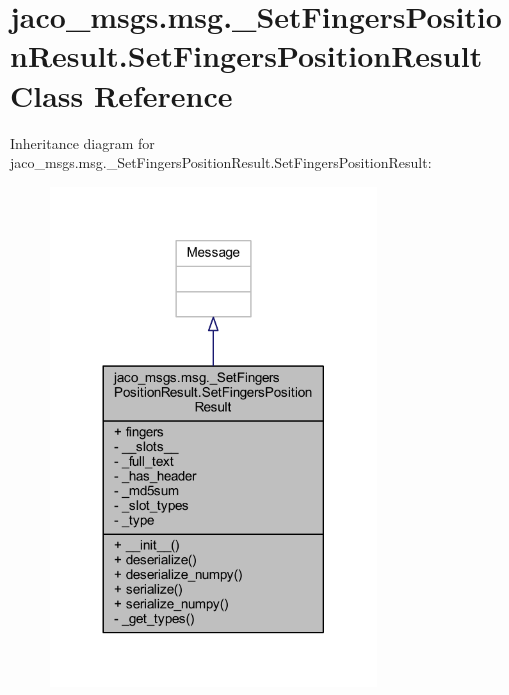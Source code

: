\hypertarget{classjaco__msgs_1_1msg_1_1__SetFingersPositionResult_1_1SetFingersPositionResult}{}\section{jaco\+\_\+msgs.\+msg.\+\_\+\+Set\+Fingers\+Position\+Result.\+Set\+Fingers\+Position\+Result Class Reference}
\label{classjaco__msgs_1_1msg_1_1__SetFingersPositionResult_1_1SetFingersPositionResult}


Inheritance diagram for jaco\+\_\+msgs.\+msg.\+\_\+\+Set\+Fingers\+Position\+Result.\+Set\+Fingers\+Position\+Result\+:
\nopagebreak
\begin{figure}[H]
\begin{center}
\leavevmode
\includegraphics[width=245pt]{da/d2c/classjaco__msgs_1_1msg_1_1__SetFingersPositionResult_1_1SetFingersPositionResult__inherit__graph}
\end{center}
\end{figure}


